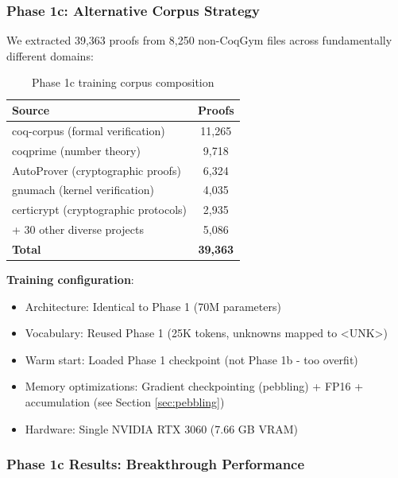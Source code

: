 \documentclass[12pt]{article}
\begin{document}
\subsubsection{Phase 1c: Alternative Corpus Strategy}

We extracted 39,363 proofs from 8,250 non-CoqGym files across fundamentally different domains:

\begin{table}[h]
\centering
\begin{tabular}{lc}
\toprule
\textbf{Source} & \textbf{Proofs} \\
\midrule
coq-corpus (formal verification) & 11,265 \\
coqprime (number theory) & 9,718 \\
AutoProver (cryptographic proofs) & 6,324 \\
gnumach (kernel verification) & 4,035 \\
certicrypt (cryptographic protocols) & 2,935 \\
+ 30 other diverse projects & 5,086 \\
\midrule
\textbf{Total} & \textbf{39,363} \\
\bottomrule
\end{tabular}
\caption{Phase 1c training corpus composition}
\end{table}

\textbf{Training configuration}:
\begin{itemize}
\item Architecture: Identical to Phase 1 (70M parameters)
\item Vocabulary: Reused Phase 1 (25K tokens, unknowns mapped to <UNK>)
\item Warm start: Loaded Phase 1 checkpoint (not Phase 1b - too overfit)
\item Memory optimizations: Gradient checkpointing (pebbling) + FP16 + accumulation (see Section \ref{sec:pebbling})
\item Hardware: Single NVIDIA RTX 3060 (7.66 GB VRAM)
\end{itemize}

\subsubsection{Phase 1c Results: Breakthrough Performance}
\end{document}
